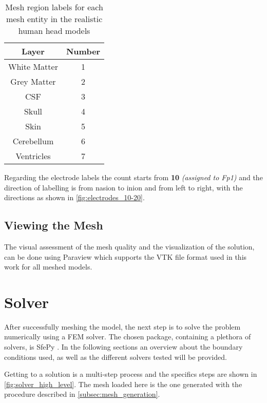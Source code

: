 \begin{table}[!ht]
	\centering
	\caption{Mesh region labels for each mesh entity in the realistic human head models}
	\label{tab:domain_annotation}
	\begin{tabular}{|c|c|}
		\hline
		\rowcolor[HTML]{C0C0C0} 
		{\color[HTML]{000000} \textbf{Layer}} & {\color[HTML]{000000} \textbf{Number}} \\ \hline
		White Matter & 1 \\ \hline
		Grey Matter & 2 \\ \hline
		\gls{CSF} & 3 \\ \hline
		Skull & 4 \\ \hline
		Skin & 5 \\ \hline
		Cerebellum & 6 \\ \hline
		Ventricles & 7 \\ \hline
	\end{tabular}
\end{table}

Regarding the electrode labels the count starts from \textbf{10} \textit{(assigned to Fp1)} and the direction of labelling is from \gls{nasion} to \gls{inion} and from left to right, with the directions as shown in \autoref{fig:electrodes_10-20}.

\subsection{Viewing the Mesh}

The visual assessment of the mesh quality and the visualization of the solution, can be done using Paraview \cite{paraview} which supports the \gls{VTK} file format used in this work for all meshed models.

\section{Solver}
\label{sec:fem_solver}

After successfully meshing the model, the next step is to solve the problem numerically using a \gls{FEM} solver. The chosen package, containing a plethora of solvers, is SfePy \cite{Cimrman2019}. In the following sections an overview about the boundary conditions used, as well as the different solvers tested will be provided.

Getting to a solution is a multi-step process and the specifics steps are shown in \autoref{fig:solver_high_level}. The mesh loaded here is the one generated with the procedure described in \ref{subsec:mesh_generation}.

